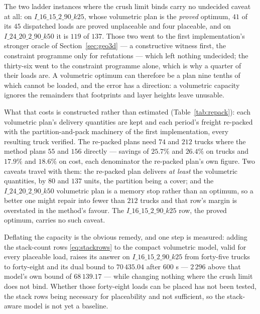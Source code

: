 The two ladder instances where the crush limit binds carry no undecided
caveat at all: on $I\_16\_15\_2\_90\_k25$, whose volumetric plan is the
\emph{proved} optimum, $41$ of its $45$ dispatched loads are proved
unplaceable and four placeable, and on $I\_24\_20\_2\_90\_k50$ it is
$119$ of $137$. Those two went to the first implementation's stronger
oracle of Section~\ref{sec:geo3d} --- a constructive witness first, the
constraint programme only for refutations --- which left nothing
undecided; the thirty-six went to the constraint programme alone, which
is why a quarter of their loads are. A volumetric optimum can therefore
be a plan nine tenths of which cannot be loaded, and the error has a
direction: a volumetric capacity ignores the remainders that footprints
and layer heights leave unusable.

What that costs is constructed rather than estimated
(Table~\ref{tab:repack}): each volumetric plan's delivery quantities
are kept and each period's freight re-packed with the
partition-and-pack machinery of the first implementation, every
resulting truck verified. The re-packed plans need $74$ and $212$
trucks where the method plans $55$ and $156$ directly --- savings
of $25.7\%$ and $26.4\%$ on trucks and
$17.9\%$ and $18.6\%$ on cost, each denominator
the re-packed plan's own figure. Two caveats travel with them: the
re-packed plan delivers \emph{at least} the volumetric quantities, by
$80$ and $137$ units, the partition being a cover; and the
$I\_24\_20\_2\_90\_k50$ volumetric plan is a memory stop rather than an
optimum, so a better one might repair into fewer than $212$ trucks and
that row's margin is overstated in the method's favour. The
$I\_16\_15\_2\_90\_k25$ row, the proved optimum, carries no such
caveat.

Deflating the capacity is the obvious remedy, and one step is measured:
adding the stack-count rows \eqref{eq:stackrows} to the compact
volumetric model, valid for every placeable load, raises its answer on
$I\_16\_15\_2\_90\_k25$ from forty-five trucks to forty-eight and its
dual bound to $70\,435.04$ after $600$ s --- $2\,296$ above that
model's own bound of $68\,139.17$ --- while changing nothing where the
crush limit does not bind. Whether those forty-eight loads can be
placed has not been tested, the stack rows being necessary for
placeability and not sufficient, so the stack-aware model is not yet a
baseline.

